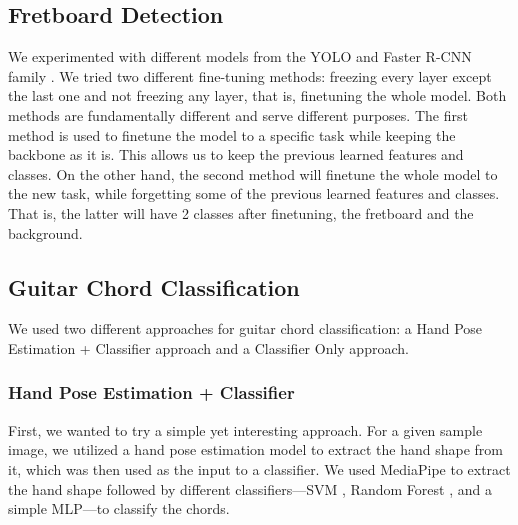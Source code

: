 \documentclass[10pt,twocolumn,letterpaper]{article}
\begin{document}
\subsection{Fretboard Detection}
We experimented with different models from the YOLO \cite{redmon2016you} and Faster R-CNN family \cite{ren2016faster}. We tried two different fine-tuning methods: freezing every layer except the last one and not freezing any layer, that is, finetuning the whole model. Both methods are fundamentally different and serve different purposes. The first method is used to finetune the model to a specific task while keeping the backbone as it is. This allows us to keep the previous learned features and classes. On the other hand, the second method will finetune the
whole model to the new task, while forgetting some of the previous learned features and classes. That is, the latter will have 2 classes after finetuning, the fretboard and the background.

\subsection{Guitar Chord Classification}
We used two different approaches for guitar chord classification: a Hand Pose Estimation + Classifier approach and a Classifier Only approach.

\subsubsection{Hand Pose Estimation + Classifier}
First, we wanted to try a simple yet interesting approach. For a given sample image, we utilized a hand pose estimation model to extract the hand shape from it, which was then used as the input to a classifier. We used MediaPipe to extract the hand shape followed by different classifiers—SVM \cite{cortes1995support}, Random Forest \cite{ho1995random}, and a simple MLP—to classify the chords.


\end{document}
